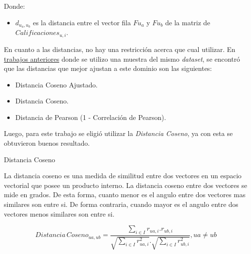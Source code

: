 \documentclass[11pt,a4paper,twoside]{thesis}
\begin{document}
\begin{description}
	\item[Donde:]
\end{description}
\begin{itemize}
	\item $d_{u_a,u_b}$ es la distancia entre el vector fila $F{u_a}$ y $F{u_b}$ de la matriz de $Calificaciones_{u,i}$.
\end{itemize}


En cuanto a las distancias, no hay una restricción acerca que cual utilizar. En  \href{https://github.com/adrianmarino/knn-cf-rec-sys/blob/master/notebooks/knn-cf-rec-sys.ipynb}{trabajos anteriores} donde se utilizo una muestra del mismo \textit{dataset}, se encontró que las distancias que mejor ajustan a este dominio son las siguientes:

\begin{itemize}
	\item Distancia Coseno Ajustado.
	\item Distancia Coseno.
	\item Distancia de Pearson (1 - Correlación de Pearson).
\end{itemize}

Luego, para este trabajo se eligió utilizar la \textit{Distancia Coseno}, ya con esta se obtuvieron buenos resultado.

\begin{description}
	\item[Distancia Coseno]
\end{description}

La distancia coseno es una medida de similitud entre dos vectores en un espacio vectorial que posee un producto interno. La distancia coseno entre dos vectores se mide en grados. 
De esta forma, cuanto menor es el angulo entre dos vectores mas similares son entre si. De forma contraria, cuando mayor es el angulo entre dos vectores menos similares son entre si.

\begin{equation}
	Distancia \mspace{3mu}Coseno_{ua, ub} = \frac{ \sum_{i \in I} r_{ua, i}.r_{ub, i}}{\sqrt{\sum_{i \in I} r_{ua, i}^2}.\sqrt{\sum_{i \in I} r_{ub, i}^2}  }, ua \neq ub
\end{equation}
\end{document}
